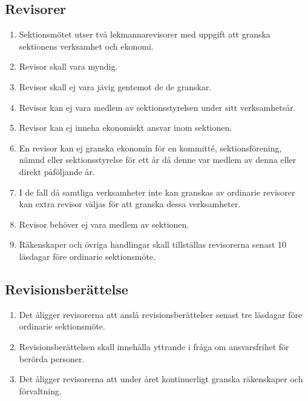 \documentclass[11pt,a4paper]{article}
\begin{document}
\subsection{Revisorer}
\begin{enumerate}[\thesubsection.1]

  \item Sektionsmötet utser två lekmannarevisorer med uppgift att granska sektionens verksamhet och ekonomi.

  \item Revisor skall vara myndig.

  \item Revisor skall ej vara jävig gentemot de de granskar.
  
  \item Revisor kan ej vara medlem av sektionsstyrelsen under sitt verksamhetsår.
  
  \item Revisor kan ej inneha ekonomiskt ansvar inom sektionen.

  \item En revisor kan ej granska ekonomin för en kommitté, sektionsförening, nämnd eller sektionsstyrelse för ett år då denne var medlem av denna eller direkt påföljande år.
  
  \item I de fall då samtliga verksamheter inte kan granskas av ordinarie revisorer kan extra revisor väljas för att granska dessa verksamheter.
  
  \item Revisor behöver ej vara medlem av sektionen.
  
  \item Räkenskaper och övriga handlingar skall tillställas revisorerna senast 10 läsdagar före ordinarie sektionsmöte.

\end{enumerate}



\subsection{Revisionsberättelse}
\begin{enumerate}[\thesubsection.1]

  \item Det åligger revisorerna att anslå revisionsberättelser senast tre läsdagar före
  ordinarie sektionsmöte.

  \item Revisionsberättelsen skall innehålla yttrande i fråga om
  ansvarsfrihet för berörda personer.

  \item Det åligger revisorerna att under året kontinuerligt granska
  rä\-ken\-skaper och förvaltning.

\end{enumerate}
\end{document}

